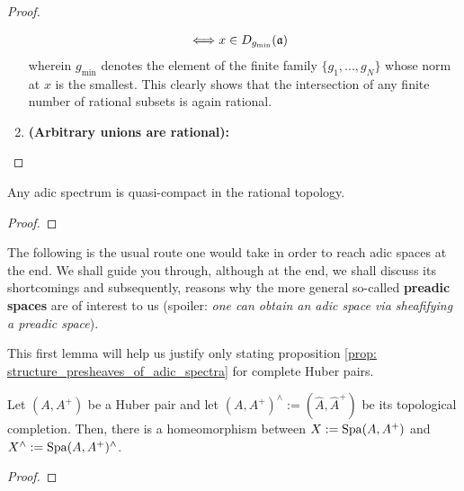 \begin{proof}
\begin{enumerate}
$$\begin{aligned}
                                                \iff & x \in D_{g_{\min}}(\mathfrak{a})
                                            \end{aligned}
                                        $$
                                    wherein $g_{\min}$ denotes the element of the finite family $\{g_1, ..., g_N\}$ whose norm at $x$ is the smallest. This clearly shows that the intersection of any finite number of rational subsets is again rational. 
                                    \item \textbf{(Arbitrary unions are rational):} 
                                \end{enumerate}
                        \end{proof}
                    \begin{corollary} \label{coro: adic_spectra_are_quasi_compact}
                        Any adic spectrum is quasi-compact in the rational topology.
                    \end{corollary}
                        \begin{proof}
                            
                        \end{proof}
                    
                    The following is the usual route one would take in order to reach adic spaces at the end. We shall guide you through, although at the end, we shall discuss its shortcomings and subsequently, reasons why the more general so-called \textbf{preadic spaces} are of interest to us (spoiler: \textit{one can obtain an adic space via sheafifying a preadic space}).
                    
                    This first lemma will help us justify only stating proposition \ref{prop: structure_presheaves_of_adic_spectra} for complete Huber pairs.
                    \begin{lemma} \label{lemma: adic_spectra_of_complete_huber_pairs}
                        Let $(A, A^+)$ be a Huber pair and let $(A, A^+)^{\wedge} := (\hat{A}, \hat{A}^+)$ be its topological completion. Then, there is a homeomorphism between $X := \mathrm{Spa}(A, A^+)$ and $X^{\wedge} := \mathrm{Spa}(A, A^+)^{\wedge}$.
                    \end{lemma}
                        \begin{proof}
                            
                        \end{proof}
                    
